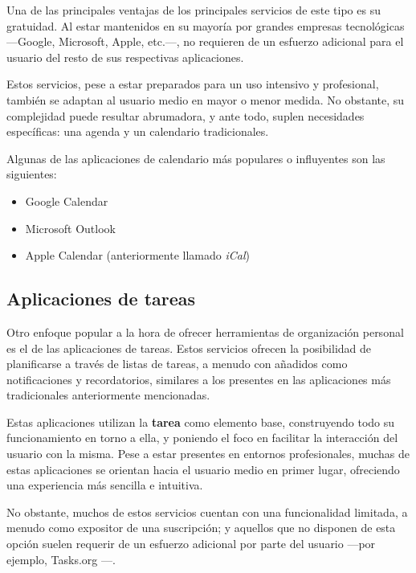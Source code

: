 \documentclass[10pt, a4paper]{aqademic}
\begin{document}
\medskip

Una de las principales ventajas de los principales servicios de este tipo es su gratuidad. Al estar mantenidos en su mayoría por grandes empresas tecnológicas ---Google, Microsoft, Apple, etc.---, no requieren de un esfuerzo adicional para el usuario del resto de sus respectivas aplicaciones.

\medskip

Estos servicios, pese a estar preparados para un uso intensivo y profesional, también se adaptan al usuario medio en mayor o menor medida. No obstante, su complejidad puede resultar abrumadora, y ante todo, suplen necesidades específicas: una agenda y un calendario tradicionales.

\medskip

Algunas de las aplicaciones de calendario más populares o influyentes son las siguientes:

\begin{itemize}
	\item Google Calendar
	\item Microsoft Outlook
	\item Apple Calendar (anteriormente llamado \textit{iCal})
\end{itemize}


\subsection*{Aplicaciones de tareas}

Otro enfoque popular a la hora de ofrecer herramientas de organización personal es el de las aplicaciones de tareas. Estos servicios ofrecen la posibilidad de planificarse a través de listas de tareas, a menudo con añadidos como notificaciones y recordatorios, similares a los presentes en las aplicaciones más tradicionales anteriormente mencionadas. 

\medskip

Estas aplicaciones utilizan la \textbf{tarea} como elemento base, construyendo todo su funcionamiento en torno a ella, y poniendo el foco en facilitar la interacción del usuario con la misma. Pese a estar presentes en entornos profesionales, muchas de estas aplicaciones se orientan hacia el usuario medio en primer lugar, ofreciendo una experiencia más sencilla e intuitiva.

\medskip

No obstante, muchos de estos servicios cuentan con una funcionalidad limitada, a menudo como expositor de una suscripción; y aquellos que no disponen de esta opción suelen requerir de un esfuerzo adicional por parte del usuario ---por ejemplo, Tasks.org \cite{tasks.org}---.
\end{document}
